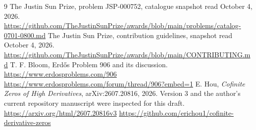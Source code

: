 \documentclass[11pt]{article}
\theoremstyle{remark}
\begin{document}
\begin{thebibliography}{9}
 The Justin Sun Prize, problem JSP-000752, catalogue
snapshot read October 4, 2026.
\url{https://github.com/TheJustinSunPrize/awards/blob/main/problems/catalog-0701-0800.md}
 The Justin Sun Prize, contribution guidelines,
snapshot read October 4, 2026.
\url{https://github.com/TheJustinSunPrize/awards/blob/main/CONTRIBUTING.md}
 T. F. Bloom, Erd\H{o}s Problem 906 and its discussion.
\url{https://www.erdosproblems.com/906}
\url{https://www.erdosproblems.com/forum/thread/906?embed=1}
 E. Hou, \emph{Cofinite Zeros of High Derivatives},
arXiv:2607.20816, 2026. Version 3 and the author's current repository
manuscript were inspected for this draft.
\url{https://arxiv.org/html/2607.20816v3}
\url{https://github.com/erichou1/cofinite-derivative-zeros}
\end{thebibliography}
\end{document}
